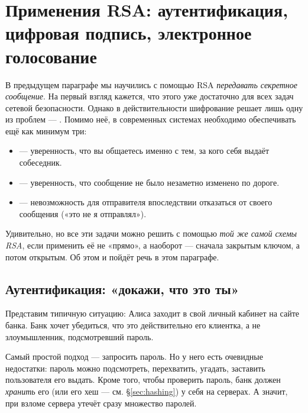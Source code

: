 \section{Применения RSA: аутентификация, цифровая подпись, электронное голосование}
\label{sec:rsa-apps}

В предыдущем параграфе мы научились с помощью RSA \emph{передавать секретное сообщение}. На первый взгляд кажется, что этого уже достаточно для всех задач сетевой безопасности. Однако в действительности шифрование решает лишь одну из проблем --- . Помимо неё, в современных системах необходимо обеспечивать ещё как минимум три:

\begin{itemize}
  \item {} --- уверенность, что вы общаетесь именно с тем, за кого себя выдаёт собеседник.
  \item {} --- уверенность, что сообщение не было незаметно изменено по дороге.
  \item {} --- невозможность для отправителя впоследствии отказаться от своего сообщения («это не я отправлял»).
\end{itemize}

Удивительно, но все эти задачи можно решить с помощью \emph{той же самой схемы RSA}, если применить её не «прямо», а наоборот --- сначала закрытым ключом, а потом открытым. Об этом и пойдёт речь в этом параграфе.

\subsection{Аутентификация: «докажи, что это ты»}
\label{subsec:auth}

Представим типичную ситуацию: Алиса заходит в свой личный кабинет на сайте банка. Банк хочет убедиться, что это действительно его клиентка, а не злоумышленник, подсмотревший пароль.

Самый простой подход --- запросить пароль. Но у него есть очевидные недостатки: пароль можно подсмотреть, перехватить, угадать, заставить пользователя его выдать. Кроме того, чтобы проверить пароль, банк должен \emph{хранить} его (или его хеш --- см. §\ref{sec:hashing}) у себя на серверах. А значит, при взломе сервера утечёт сразу множество паролей.

